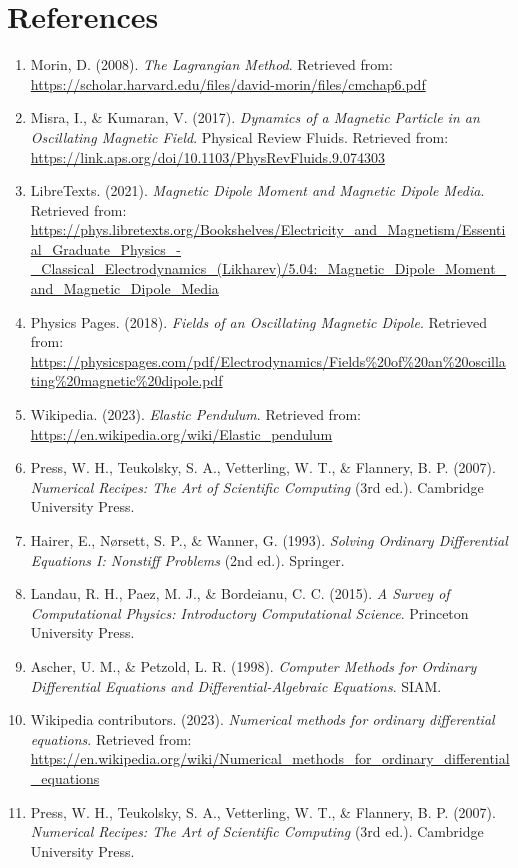 \documentclass[12pt]{article}
\begin{document}
\section*{References}
\begin{enumerate}
    \item Morin, D. (2008). \textit{The Lagrangian Method}. Retrieved from: \url{https://scholar.harvard.edu/files/david-morin/files/cmchap6.pdf}
    \item Misra, I., \& Kumaran, V. (2017). \textit{Dynamics of a Magnetic Particle in an Oscillating Magnetic Field}. Physical Review Fluids. Retrieved from: \url{https://link.aps.org/doi/10.1103/PhysRevFluids.9.074303}
    \item LibreTexts. (2021). \textit{Magnetic Dipole Moment and Magnetic Dipole Media}. Retrieved from: \url{https://phys.libretexts.org/Bookshelves/Electricity_and_Magnetism/Essential_Graduate_Physics_-_Classical_Electrodynamics_(Likharev)/5.04:_Magnetic_Dipole_Moment_and_Magnetic_Dipole_Media}
    \item Physics Pages. (2018). \textit{Fields of an Oscillating Magnetic Dipole}. Retrieved from: \url{https://physicspages.com/pdf/Electrodynamics/Fields%20of%20an%20oscillating%20magnetic%20dipole.pdf}
    \item Wikipedia. (2023). \textit{Elastic Pendulum}. Retrieved from: \url{https://en.wikipedia.org/wiki/Elastic_pendulum}
    \item Press, W. H., Teukolsky, S. A., Vetterling, W. T., \& Flannery, B. P. (2007). \textit{Numerical Recipes: The Art of Scientific Computing} (3rd ed.). Cambridge University Press.
    \item Hairer, E., Nørsett, S. P., \& Wanner, G. (1993). \textit{Solving Ordinary Differential Equations I: Nonstiff Problems} (2nd ed.). Springer.
    \item Landau, R. H., Paez, M. J., \& Bordeianu, C. C. (2015). \textit{A Survey of Computational Physics: Introductory Computational Science}. Princeton University Press.
    \item Ascher, U. M., \& Petzold, L. R. (1998). \textit{Computer Methods for Ordinary Differential Equations and Differential-Algebraic Equations}. SIAM.
    \item Wikipedia contributors. (2023). \textit{Numerical methods for ordinary differential equations}. Retrieved from: \url{https://en.wikipedia.org/wiki/Numerical_methods_for_ordinary_differential_equations}
     \item Press, W. H., Teukolsky, S. A., Vetterling, W. T., \& Flannery, B. P. (2007). \textit{Numerical Recipes: The Art of Scientific Computing} (3rd ed.). Cambridge University Press.

\end{enumerate}
\end{document}
